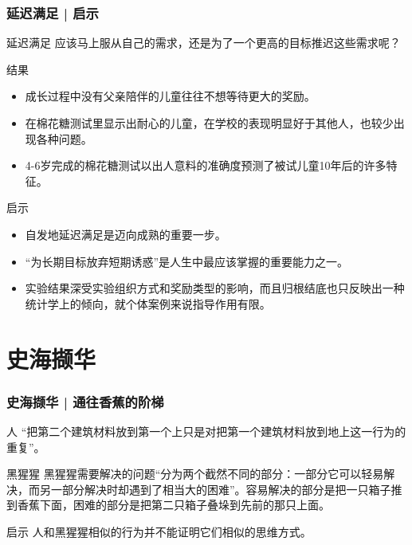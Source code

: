 \begin{frame}
  \frametitle{延迟满足 | 启示}
  \begin{block}{延迟满足}
    应该马上服从自己的需求，还是为了一个更高的目标推迟这些需求呢？
  \end{block}
  \vspace{-0.5em}
  \pause
  \begin{block}{结果}
    \begin{itemize}
      \item 成长过程中没有父亲陪伴的儿童往往不想等待更大的奖励。
      \item 在棉花糖测试里显示出耐心的儿童，在学校的表现明显好于其他人，也较少出现各种问题。
      \item 4-6岁完成的棉花糖测试以出人意料的准确度预测了被试儿童10年后的许多特征。
    \end{itemize}
  \end{block}
  \vspace{-0.5em}
  \pause
  \begin{block}{启示}
    \begin{itemize}
      \item 自发地延迟满足是迈向成熟的重要一步。
      \item “为长期目标放弃短期诱惑”是人生中最应该掌握的重要能力之一。
      \item 实验结果深受实验组织方式和奖励类型的影响，而且归根结底也只反映出一种统计学上的倾向，就个体案例来说指导作用有限。
    \end{itemize}
  \end{block}
\end{frame}

\section{史海撷华}
\begin{frame}
  \frametitle{史海撷华 | 通往香蕉的阶梯}
  \begin{block}{人}
    “把第二个建筑材料放到第一个上只是对把第一个建筑材料放到地上这一行为的重复”。
  \end{block}
  \pause
  \begin{block}{黑猩猩}
    黑猩猩需要解决的问题“分为两个截然不同的部分：一部分它可以轻易解决，而另一部分解决时却遇到了相当大的困难”。容易解决的部分是把一只箱子推到香蕉下面，困难的部分是把第二只箱子叠垛到先前的那只上面。
  \end{block}
  \pause
  \begin{block}{启示}
    人和黑猩猩相似的行为并不能证明它们相似的思维方式。
  \end{block}
\end{frame}

